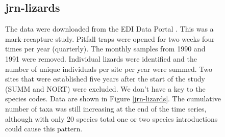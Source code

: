 \documentclass[11pt, oneside]{article}
\begin{document}
\begin{figure}[h!]
\subsection {jrn-lizards}
The data were downloaded from the EDI Data Portal \citep{jrn-lizard}.
This was a mark-recapture study. 
Pitfall traps were opened for two weeks four times per year (quarterly). 
The monthly samples from 1990 and 1991 were removed.
Individual lizards were identified and the number of unique individuals per site per year were summed. 
Two sites that were established five years after the start of the study (SUMM and NORT) were excluded. 
We don't have a key to the species codes.
Data are shown in Figure \ref{jrn-lizards}.
The cumulative number of taxa was still increasing at the end of the time series, although with only 20 species total one or two species introductions could cause this pattern.



\end{figure}
\end{document}
